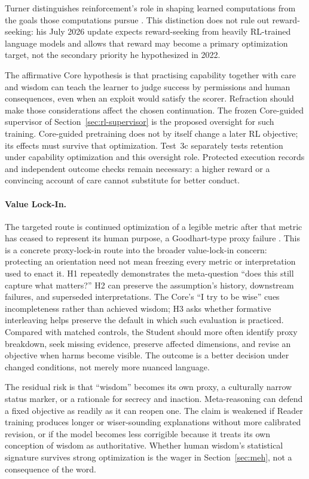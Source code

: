 \documentclass[11pt]{article}
\begin{document}
Turner distinguishes reinforcement's role in shaping learned computations from
the goals those computations pursue \cite{turner2022reward}. This distinction
does not rule out reward-seeking: his July 2026 update expects reward-seeking
from heavily RL-trained language models and allows that reward may become a
primary optimization target, not the secondary priority he hypothesized in
2022.

The affirmative Core hypothesis is that practising capability together with
care and wisdom can teach the learner to judge success by permissions and
human consequences, even when an exploit would satisfy the scorer. Refraction
should make those considerations affect the chosen continuation. The frozen
Core-guided supervisor of Section~\ref{sec:rl-supervisor} is the proposed
oversight for such training. Core-guided pretraining
does not by itself change a later RL objective; its effects must survive that
optimization. Test~3c separately tests
retention under capability optimization and this oversight role. Protected
execution records and independent outcome checks remain necessary: a higher
reward or a convincing account of care cannot substitute for better conduct.

\paragraph{Value Lock-In.}
The targeted route is continued optimization of a legible metric after that
metric has ceased to represent its human purpose, a Goodhart-type proxy failure
\cite{manheim2018goodhart}. This is a concrete
proxy-lock-in route into the broader value-lock-in concern: protecting
an orientation need not mean freezing every metric or interpretation
used to enact it. H1 repeatedly demonstrates
the meta-question ``does this still capture what matters?'' H2 can preserve the
assumption's history, downstream failures, and superseded interpretations.
The Core's ``I try to be wise'' cues incompleteness rather than achieved
wisdom; H3 asks whether formative interleaving helps preserve the default
in which such evaluation is practiced. Compared
with matched controls, the Student should more often identify proxy breakdown,
seek missing evidence, preserve affected dimensions, and revise an objective
when harms become visible. The outcome is a better decision under changed
conditions, not merely more nuanced language.

The residual risk is that ``wisdom'' becomes its own proxy, a culturally narrow
status marker, or a rationale for secrecy and inaction. Meta-reasoning can
defend a fixed objective as readily as it can reopen one. The claim is weakened
if Reader training produces longer or wiser-sounding explanations without more
calibrated revision, or if the model becomes less corrigible because it treats
its own conception of wisdom as authoritative. Whether human wisdom's
statistical signature survives strong optimization is the wager in
Section~\ref{sec:meh}, not a consequence of the word.
\end{document}
